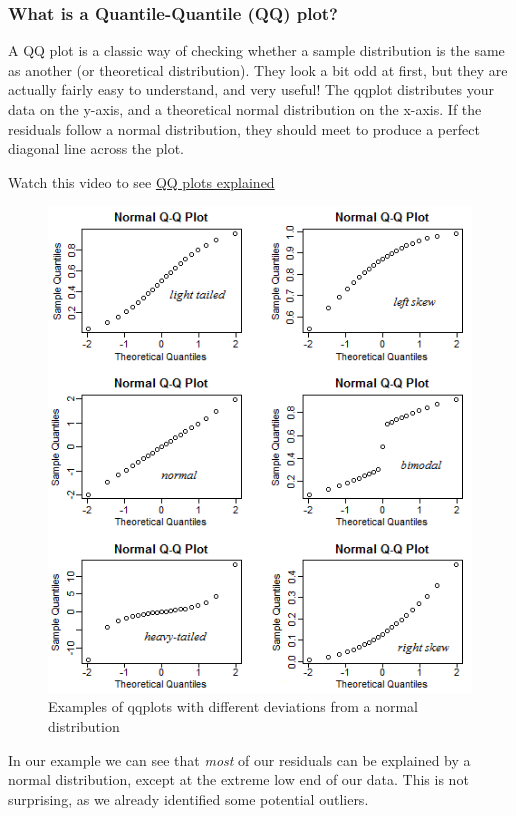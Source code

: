\documentclass[
]{book}
\begin{document}
\hypertarget{what-is-a-quantile-quantile-qq-plot}{%
\subsubsection{What is a Quantile-Quantile (QQ) plot?}\label{what-is-a-quantile-quantile-qq-plot}}

A QQ plot is a classic way of checking whether a sample distribution is the same as another (or theoretical distribution). They look a bit odd at first, but they are actually fairly easy to understand, and very useful! The qqplot distributes your data on the y-axis, and a theoretical normal distribution on the x-axis. If the residuals follow a normal distribution, they should meet to produce a perfect diagonal line across the plot.

Watch this video to see \href{https://www.youtube.com/watch?v=okjYjClSjOg}{QQ plots explained}

\begin{figure}
\includegraphics[width=0.8\linewidth]{images/qq_example} \caption{Examples of qqplots with different deviations from a normal distribution}\label{fig:unnamed-chunk-399}
\end{figure}

In our example we can see that \emph{most} of our residuals can be explained by a normal distribution, except at the extreme low end of our data. This is not surprising, as we already identified some potential outliers.
\end{document}
